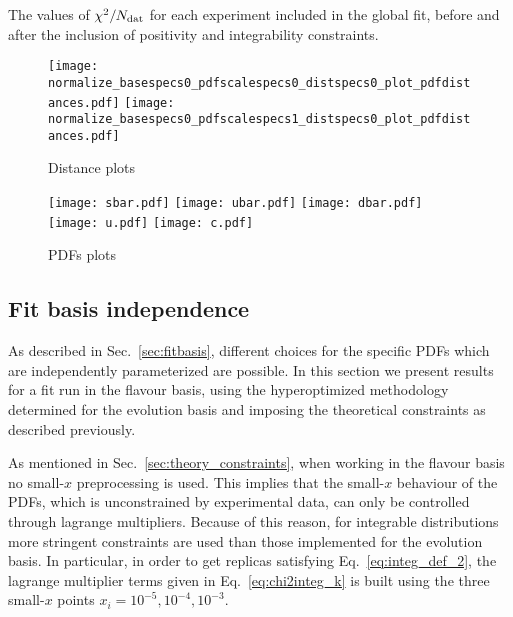   \begin{table}[htbp!]
    \centering
    
    \caption{The values of $\chi^2/N_{\rm dat}$ for each experiment included in the global fit, before and
    after the inclusion of positivity and integrability constraints.}
    \label{tab:experiments_chi2}
  \end{table}

  \begin{figure}[t!]
    \begin{center}
        \texttt{[image: normalize\_basespecs0\_pdfscalespecs0\_distspecs0\_plot\_pdfdistances.pdf]}
        \texttt{[image: normalize\_basespecs0\_pdfscalespecs1\_distspecs0\_plot\_pdfdistances.pdf]}
        \caption{Distance plots} 
        \label{fig:distances} 
    \end{center}
  \end{figure}

  \begin{figure}[t!]
    \begin{center}
        \texttt{[image: sbar.pdf]}
        \texttt{[image: ubar.pdf]}
        \texttt{[image: dbar.pdf]}
        \texttt{[image: u.pdf]}
        \texttt{[image: c.pdf]}
        \caption{PDFs plots} 
        \label{fig:pdfs_plots} 
    \end{center}
  \end{figure}

\subsection{Fit basis independence}
As described in Sec.~\ref{sec:fitbasis}, different choices for the specific PDFs which are independently
parameterized are possible.
In this section we present results for a fit run in the flavour basis, using the hyperoptimized methodology
determined for the evolution basis and imposing the theoretical constraints as described previously.

%
As mentioned in Sec.~\ref{sec:theory_constraints}, when working in the flavour basis 
no small-$x$ preprocessing is used. This implies that the small-$x$ behaviour of the PDFs, which is unconstrained 
by experimental data, can only be controlled through lagrange multipliers.
Because of this reason, for integrable distributions more stringent constraints are used than those implemented
for the evolution basis. In particular, in order to get replicas satisfying Eq.~\eqref{eq:integ_def_2},
the lagrange multiplier terms given in Eq.~\eqref{eq:chi2integ_k} is built using the three small-$x$
points $x_i = 10^{-5}, 10^{-4}, 10^{-3}$. 

